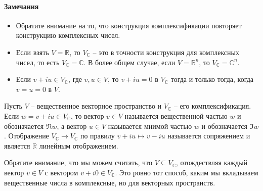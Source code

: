 \paragraph{Замечания}
\begin{itemize}
\item Обратите внимание на то, что конструкция комплексификации повторяет конструкцию комплексных чисел.

\item Если взять $V = \mathbb R$, то $V_\mathbb C$ -- это в точности конструкция для комплексных чисел, то есть $V_\mathbb C = \mathbb C$. В более общем случае, если $V = \mathbb R^n$, то $V_\mathbb C = \mathbb C^n$.

\item Если $v+iu\in V_\mathbb C$, где $v,u\in V$, то $v + iu = 0$ в $V_\mathbb C$ тогда и только тогда, когда $v = u = 0 $ в $V$.

\end{itemize}

\begin{definition}
Пусть $V$ -- вещественное векторное пространство и $V_\mathbb C$ -- его комплексификация. Если $w = v +i u\in V_\mathbb C$, то вектор $v\in V$ называется вещественной частью $w$ и обозначается $\Re w$, а вектор $u\in V$ называется мнимой частью $w$ и обозначается $\Im w$. Отображение $V_\mathbb C\to V_\mathbb C$ по правилу $v+iu\mapsto v-iu$ называется сопряжением и является $\mathbb R$ линейным отображением.
\end{definition}

Обратите внимание, что мы можем считать, что $V\subseteq V_\mathbb C$, отождествляя каждый вектор $v\in V$ с вектором $v+i0\in V_\mathbb C$. Это ровно тот способ, каким мы вкладываем вещественные числа в комплексные, но для векторных пространств.

